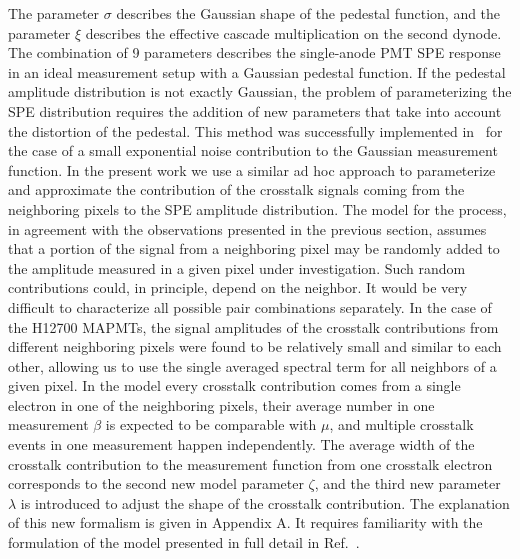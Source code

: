 The parameter ${\sigma}$ describes the Gaussian shape of the pedestal function, and the parameter ${\xi}$  describes the effective cascade multiplication on the second dynode. The combination of 9 parameters describes the single-anode PMT SPE response in an ideal measurement setup with a Gaussian pedestal function. If the pedestal amplitude distribution is not exactly Gaussian, the problem of parameterizing the SPE distribution requires the addition of new parameters that take into account the distortion of the pedestal. This method was successfully implemented in~\cite{DEGTIARENKO20171} for the case of a small exponential noise contribution to the Gaussian measurement function. In the present work we use a similar ad hoc approach to parameterize and approximate the contribution of the crosstalk signals coming from the neighboring pixels to the SPE amplitude distribution. The model for the process, in agreement with the observations presented in the previous section, assumes that a portion of the signal from a neighboring pixel may be randomly added to the amplitude measured in a given pixel under investigation. Such random contributions could, in principle, depend on the neighbor. It would be very difficult to characterize all possible pair combinations separately. In the case of the H12700 MAPMTs, the signal amplitudes of the crosstalk contributions from different neighboring pixels were found to be relatively small and similar to each other, allowing us to use the single averaged spectral term for all neighbors of a given pixel. In the model every crosstalk contribution comes from a single electron in one of the neighboring pixels, their average number in one measurement $\beta$ is expected to be comparable with $\mu$, and multiple crosstalk events in one measurement happen independently. The average width of the crosstalk contribution to the measurement function from one crosstalk electron corresponds to the second new model parameter $\zeta$, and the third new parameter $\lambda$ is introduced to adjust the shape of the crosstalk contribution. The explanation of this new formalism is given in Appendix A. It requires familiarity with the formulation of the model presented in full detail in Ref.~\cite{DEGTIARENKO20171}.

